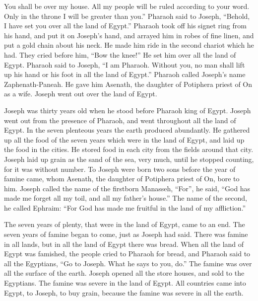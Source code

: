 {You shall be over my house. All my people will be ruled according to your word. Only in the throne I will be greater than you.”
Pharaoh said to Joseph, “Behold, I have set you over all the land of Egypt.”
Pharaoh took off his signet ring from his hand, and put it on Joseph’s hand, and arrayed him in robes of fine linen, and put a gold chain about his neck.
He made him ride in the second chariot which he had. They cried before him, “Bow the knee!” He set him over all the land of Egypt.
Pharaoh said to Joseph, “I am Pharaoh. Without you, no man shall lift up his hand or his foot in all the land of Egypt.”
Pharaoh called Joseph’s name Zaphenath-Paneah. He gave him Asenath, the daughter of Potiphera priest of On as a wife. Joseph went out over the land of Egypt.
\par }{\PP {}Joseph was thirty years old when he stood before Pharaoh king of Egypt. Joseph went out from the presence of Pharaoh, and went throughout all the land of Egypt.
In the seven plenteous years the earth produced abundantly.
He gathered up all the food of the seven years which were in the land of Egypt, and laid up the food in the cities. He stored food in each city from the fields around that city.
Joseph laid up grain as the sand of the sea, very much, until he stopped counting, for it was without number.
To Joseph were born two sons before the year of famine came, whom Asenath, the daughter of Potiphera priest of On, bore to him.
Joseph called the name of the firstborn Manasseh, “For”, he said, “God has made me forget all my toil, and all my father’s house.”
The name of the second, he called Ephraim: “For God has made me fruitful in the land of my affliction.”
\par }{\PP {}The seven years of plenty, that were in the land of Egypt, came to an end.
The seven years of famine began to come, just as Joseph had said. There was famine in all lands, but in all the land of Egypt there was bread.
When all the land of Egypt was famished, the people cried to Pharaoh for bread, and Pharaoh said to all the Egyptians, “Go to Joseph. What he says to you, do.”
The famine was over all the surface of the earth. Joseph opened all the store houses, and sold to the Egyptians. The famine was severe in the land of Egypt.
All countries came into Egypt, to Joseph, to buy grain, because the famine was severe in all the earth.

}
